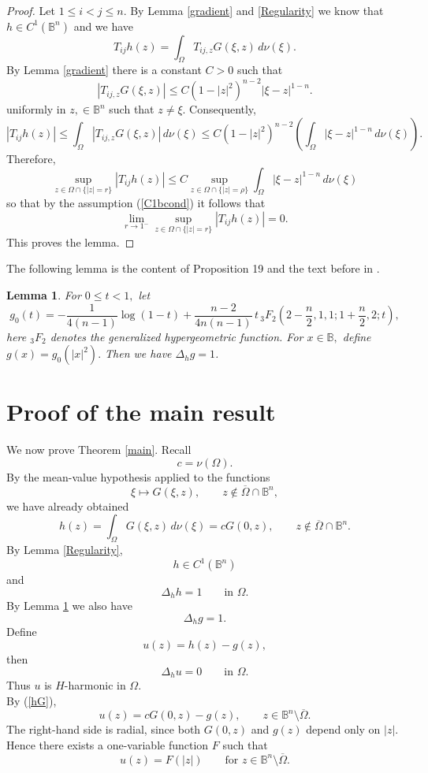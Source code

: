\documentclass[12pt]{amsart}
\numberwithin{equation}{section}
\newtheorem{lemma}[thm]{Lemma}
\newcommand{\Bn}{\mathbb B^n}
\newcommand{\Dh}{\Delta_h}
\theoremstyle{plain}
\numberwithin{equation}{section}
\numberwithin{theorem}{section}
\numberwithin{proposition}{section}
\begin{document}
\begin{proof} Let  \(1\le i<j\le n\).
By  Lemma \ref{gradient} and  \ref{Regularity} we know that  \(h\in C^1(\mathbb B^n)\) and we have
\[
T_{ij}h(z)
=
\int_\Omega T_{ij,z}G(\xi,z)\,d\nu(\xi).
\]
By Lemma \ref{gradient} there is a constant $C>0$ such  that
\[
|T_{ij,z}G(\xi,z)|
\le
C(1-|z|^2)^{n-2}|\xi-z|^{1-n}.
\]
uniformly in $z, \in  \mathbb B^n$ such that $z\not =\xi.$ Consequently,
\[
|T_{ij}h(z)|
\le
\int_\Omega |T_{ij,z}G(\xi,z)|\,d\nu(\xi)
\le
C(1-|z|^2)^{n-2}\left(\int_\Omega |\xi-z|^{1-n}\,d\nu(\xi)\right).
\]
Therefore, 
\[
\sup_{z\in\Omega\cap\{|z|=r\}}
|T_{ij}h(z)|
\le
C
\sup_{z\in\Omega\cap\{|z|=\rho\}}
\int_\Omega |\xi-z|^{1-n}\,d\nu(\xi)
\]
so that by the assumption (\ref{C1bcond}) it follows that
\[
\lim_{r\to1^-}
\sup_{z\in\Omega\cap\{|z|=r\}}
|T_{ij}h(z)|
=0.
\]
This proves the lemma.
\end{proof}

The following lemma is the content of Proposition 19 and the text before in \cite{BEY}. 
\begin{lemma}\label{g}
For  $0\leq t<1,$ let 
\[
g_0(t)
=
-\frac{1}{4(n-1)}\log(1-t)
+
\frac{n-2}{4n(n-1)}\,t\,
{}_3F_2\left(
2-\frac n2,1,1;
1+\frac n2,2;
t
\right),
\]
here ${}_3F_2$ denotes the generalized hypergeometric function. For $x\in \mathbb B, $ 
define
$
g(x)=g_0(|x|^2).
$
Then we have $\Dh g=1$. 
\end{lemma}







\section{Proof of the main result}

We now prove Theorem \ref{main}. Recall
\[
c=\nu(\Omega).
\]
By the mean-value hypothesis applied to the functions
\[
\xi\longmapsto G(\xi,z),
\qquad z\notin \overline{\Omega}\cap\mathbb B^n,
\]
we have already obtained
\[
h(z)=\int_\Omega G(\xi,z)\,d\nu(\xi)=cG(0,z),
\qquad z\notin \overline{\Omega}\cap\mathbb B^n.
\]
By Lemma \ref{Regularity},
\[
h\in C^1(\Bn)
\]
and
\[
\Delta_h h=1
\qquad\text{in }\Omega.
\]
By Lemma \ref{g} we also have
\[
\Delta_h g=1.
\]
Define
\[
u(z)=h(z)-g(z),
\]
then
\[
\Delta_h u=0
\qquad\text{in }\Omega.
\]
Thus \(u\) is \(H\)-harmonic in \(\Omega\).\\
By (\ref{hG}),
\[
u(z)=cG(0,z)-g(z),
\qquad z\in\mathbb B^n\setminus\overline\Omega.
\]
The right-hand side is radial, since both \(G(0,z)\) and \(g(z)\) depend only
on \(|z|\). Hence there exists a one-variable function \(F\) such that
\[
u(z)=F(|z|)
\qquad\text{for }z\in\mathbb B^n\setminus\overline\Omega.
\]
\end{document}
